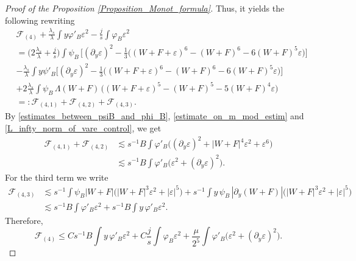 \documentclass[16pt,english, oneside,reqno]{smfart}
\newcommand{\vare}{{\varepsilon}}
\newcommand{\vphi}{{\varphi}}
\begin{document}
\begin{proof}[Proof of the Proposition \ref{Proposition_Monot_formula}]
Thus, it yields the following rewriting
\begin{equation}
    \begin{split}
        & \mathcal{F}_{(4)} + \frac{\lambda_s}{\lambda}\int y \vphi'_B\vare^2 - \frac{j}{s}\int \vphi_B \vare^2\\
        & = \Big( 2 \frac{\lambda_s}{\lambda}+\frac{j}{s} \Big)\int \psi_B\, \Big[ (\partial_y\vare)^2
        - \frac{1}{3}\big( (W+F+\vare)^6 - (W+F)^6 - 6 (W+F)^5\vare\big) \Big]\\
        & -\frac{\lambda_s}{\lambda}\int y \psi'_B \Big[ (\partial_y\vare)^2
        - \frac{1}{3}\big( (W+F+\vare)^6 - (W+F)^6 - 6 (W+F)^5\vare\big) \Big]\\
        & +2\frac{\lambda_s}{\lambda}\int \psi_B\,\Lambda(W+F)\, \big( (W+F+\vare)^5 - (W+F)^5 -5 (W+F)^4 \vare\big) \\
        & =: \mathcal{F}_{(4,1)}+\mathcal{F}_{(4,2)}+\mathcal{F}_{(4,3)}.
    \end{split}
\end{equation}
By \eqref{estimates_between_psiB_and_phi_B}, \eqref{estimate_on_m_mod_estim} and \eqref{L_infty_norm_of_vare_control}, we get
\begin{equation}
\begin{split}
    \mathcal{F}_{(4,1)}+\mathcal{F}_{(4,2)}& \lesssim s^{-1}B\int \vphi'_B \big( (\partial_y \vare)^2 + |W+F|^4\vare^2 + \vare^6 \big)\\
    & \lesssim s^{-1}B\int \vphi'_B\big( \vare
    ^2 + (\partial_y \vare)^2\big) .
\end{split}
\end{equation}
For the third term we write
\begin{equation}
    \begin{split}
        \mathcal{F}_{(4,3)} & \lesssim s^{-1}\int \psi_B|W+F|\big( |W+F|^3\vare^2 + |\vare|^5 \big)+s^{-1}\int  y\, \psi_B\, |\partial_y (W+F)|\big( |W+F|^3\vare^2 + |\vare|^5 \big)\\
        & \lesssim s^{-1}B\int \vphi'_B \vare^2 + s^{-1}B\int y 
        \,\vphi'_B \vare^2.
    \end{split}
\end{equation}
Therefore, 
\begin{equation}\label{mathcalF_estim_onF4}
    \mathcal{F}_{(4)} \leq  Cs^{-1}B  \int y\, \vphi'_B\vare^2 + C\frac{j}{s}\int \vphi_B \vare^2 + \frac{\mu}{2^{5}}\int \vphi'_B\big( \vare
    ^2 + (\partial_y \vare)^2\big) .
\end{equation}


\end{proof}
\end{document}
